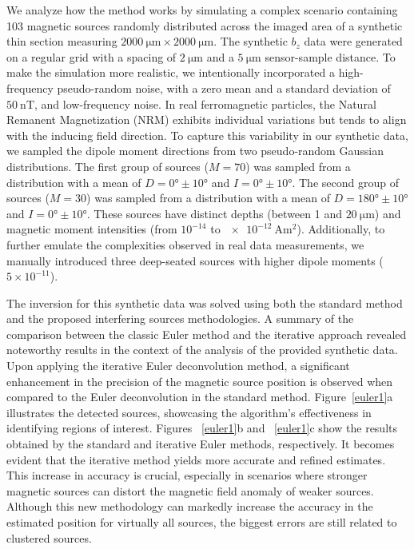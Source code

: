 We analyze how the method works by simulating a complex scenario containing 103 magnetic sources randomly distributed across the imaged area of a synthetic thin section measuring $\qty{2000}{\um} \times \qty{2000}{\um}$. The synthetic $b_z$ data were generated on a regular grid with a spacing of $\qty{2}{\um}$ and a $\qty{5}{\um}$ sensor-sample distance. To make the simulation more realistic, we intentionally incorporated a high-frequency pseudo-random noise, with a zero mean and a standard deviation of $\qty{50}{\nano\tesla}$, and low-frequency noise. In real ferromagnetic particles, the Natural Remanent Magnetization (NRM) exhibits individual variations but tends to align with the inducing field direction. To capture this variability in our synthetic data, we sampled the dipole moment directions from two pseudo-random Gaussian distributions. The first group of sources ($M = 70$) was sampled from a distribution with a mean of $D = \ang{0}\pm\ang{10}$ and $I = \ang{0}\pm\ang{10}$. The second group of sources ($M = 30$) was sampled from a distribution with a mean of $D = \ang{180}\pm\ang{10}$ and $I = \ang{0}\pm\ang{10}$. These sources have distinct depths (between 1 and $\qty{20}{\um}$) and magnetic moment intensities (from $10^{-14}$ to $\qty{e-12}{\ampere\m\squared}$). Additionally, to further emulate the complexities observed in real data measurements, we manually introduced three deep-seated sources with higher dipole moments ($5 \times 10^{-11}$). 

The inversion for this synthetic data was solved using both the standard method \citep{Souza-Junior2023b} and the proposed interfering sources methodologies. A summary of the comparison between the classic Euler method and the iterative approach revealed noteworthy results in the context of the analysis of the provided synthetic data. Upon applying the iterative Euler deconvolution method, a significant enhancement in the precision of the magnetic source position is observed when compared to the Euler deconvolution in the standard method. Figure~\ref{euler1}a illustrates the detected sources, showcasing the algorithm's effectiveness in identifying regions of interest. Figures ~\ref{euler1}b and ~\ref{euler1}c show the results obtained by the standard and iterative Euler methods, respectively. It becomes evident that the iterative method yields more accurate and refined estimates. This increase in accuracy is crucial, especially in scenarios where stronger magnetic sources can distort the magnetic field anomaly of weaker sources. Although this new methodology can markedly increase the accuracy in the estimated position for virtually all sources, the biggest errors are still related to clustered sources.

